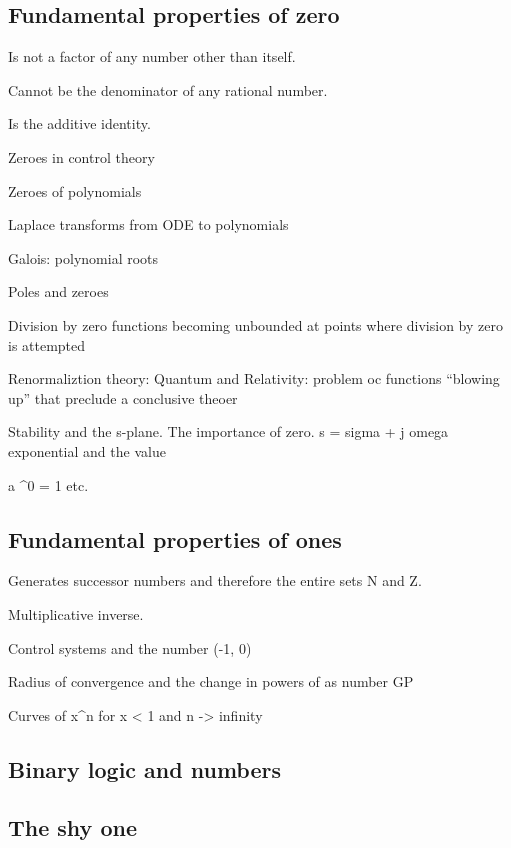 \documentclass[
  a4paper,
]{article}
\begin{document}
\hypertarget{fundamental-properties-of-zero}{%
\subsection{Fundamental properties of
zero}\label{fundamental-properties-of-zero}}

Is not a factor of any number other than itself.

Cannot be the denominator of any rational number.

Is the additive identity.

Zeroes in control theory

Zeroes of polynomials

Laplace transforms from ODE to polynomials

Galois: polynomial roots

Poles and zeroes

Division by zero functions becoming unbounded at points where division
by zero is attempted

Renormaliztion theory: Quantum and Relativity: problem oc functions
``blowing up'' that preclude a conclusive theoer

Stability and the s-plane. The importance of zero. s = sigma + j omega
exponential and the value

a \^{}0 = 1 etc.

\hypertarget{fundamental-properties-of-ones}{%
\subsection{Fundamental properties of
ones}\label{fundamental-properties-of-ones}}

Generates successor numbers and therefore the entire sets N and Z.

Multiplicative inverse.

Control systems and the number (-1, 0)

Radius of convergence and the change in powers of as number GP

Curves of x\^{}n for x \textless{} 1 and n -\textgreater{} infinity

\hypertarget{binary-logic-and-numbers}{%
\subsection{Binary logic and numbers}\label{binary-logic-and-numbers}}

\hypertarget{the-shy-one}{%
\subsection{The shy one}\label{the-shy-one}}
\end{document}
